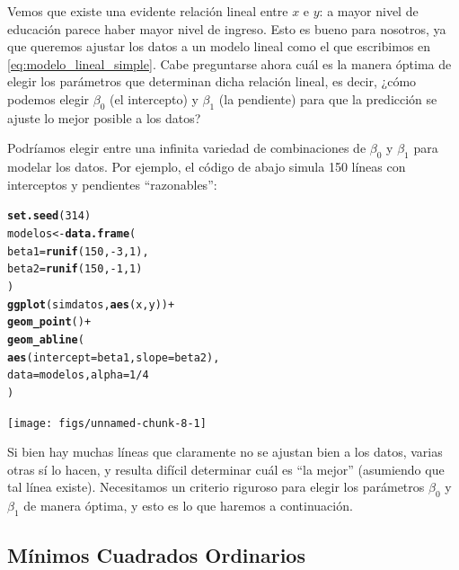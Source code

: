 \documentclass{article}\usepackage[]{graphicx}\usepackage[]{color}
\makeatletter
\newcommand{\hlnum}[1]{\textcolor[rgb]{0.686,0.059,0.569}{#1}}%
\newcommand{\hlopt}[1]{\textcolor[rgb]{0,0,0}{#1}}%
\newcommand{\hlstd}[1]{\textcolor[rgb]{0.345,0.345,0.345}{#1}}%
\newcommand{\hlkwb}[1]{\textcolor[rgb]{0.69,0.353,0.396}{#1}}%
\newcommand{\hlkwc}[1]{\textcolor[rgb]{0.333,0.667,0.333}{#1}}%
\newcommand{\hlkwd}[1]{\textcolor[rgb]{0.737,0.353,0.396}{\textbf{#1}}}%
\newenvironment{kframe}{%
 \def\at@end@of@kframe{}%
 \ifinner\ifhmode%
  \def\at@end@of@kframe{\end{minipage}}%
  \begin{minipage}{\columnwidth}%
 \fi\fi%
 \def\FrameCommand##1{\hskip\@totalleftmargin \hskip-\fboxsep
 \colorbox{shadecolor}{##1}\hskip-\fboxsep
     \hskip-\linewidth \hskip-\@totalleftmargin \hskip\columnwidth}%
 \MakeFramed {\advance\hsize-\width
   \@totalleftmargin\z@ \linewidth\hsize
   \@setminipage}}%
 {\par\unskip\endMakeFramed%
 \at@end@of@kframe}
\newenvironment{knitrout}{}{} %
\makeatother
\begin{document}
Vemos que existe una evidente relación lineal entre $x$ e $y$: a mayor nivel de educación parece haber mayor nivel de ingreso.
Esto es bueno para nosotros, ya que queremos ajustar los datos a un modelo lineal como el que escribimos en \eqref{eq:modelo_lineal_simple}.
Cabe preguntarse ahora cuál es la manera óptima de elegir los parámetros que determinan dicha relación lineal, es decir, ¿cómo podemos elegir $\beta_0$ (el intercepto) y $\beta_1$ (la pendiente) para que la predicción se ajuste lo mejor posible a los datos?

Podríamos elegir entre una infinita variedad de combinaciones de $\beta_0$ y $\beta_1$ para modelar los datos. Por ejemplo, el código de abajo simula 150 líneas con interceptos y pendientes ``razonables'':

\begin{knitrout}
\color{fgcolor}\begin{kframe}
\begin{alltt}
\hlkwd{set.seed}\hlstd{(}\hlnum{314}\hlstd{)}
\hlstd{modelos} \hlkwb{<-} \hlkwd{data.frame}\hlstd{(}
  \hlkwc{beta1} \hlstd{=} \hlkwd{runif}\hlstd{(}\hlnum{150}\hlstd{,} \hlopt{-}\hlnum{3}\hlstd{,} \hlnum{1}\hlstd{),}
  \hlkwc{beta2} \hlstd{=} \hlkwd{runif}\hlstd{(}\hlnum{150}\hlstd{,} \hlopt{-}\hlnum{1}\hlstd{,} \hlnum{1}\hlstd{)}
\hlstd{)}
\hlkwd{ggplot}\hlstd{(simdatos,} \hlkwd{aes}\hlstd{(x, y))} \hlopt{+}
  \hlkwd{geom_point}\hlstd{()} \hlopt{+}
  \hlkwd{geom_abline}\hlstd{(}
    \hlkwd{aes}\hlstd{(}\hlkwc{intercept} \hlstd{= beta1,} \hlkwc{slope} \hlstd{= beta2),}
    \hlkwc{data} \hlstd{= modelos,} \hlkwc{alpha} \hlstd{=} \hlnum{1}\hlopt{/}\hlnum{4}
  \hlstd{)}
\end{alltt}
\end{kframe}

{\centering \texttt{[image: figs/unnamed-chunk-8-1]} 

}



\end{knitrout}

Si bien hay muchas líneas que claramente no se ajustan bien a los datos, varias otras sí lo hacen, y resulta difícil determinar cuál es ``la mejor'' (asumiendo que tal línea existe).
Necesitamos un criterio riguroso para elegir los parámetros $\beta_0$ y $\beta_1$ de manera óptima, y esto es lo que haremos a continuación.


\subsection{Mínimos Cuadrados Ordinarios}
\label{sec:MCO}
\end{document}

